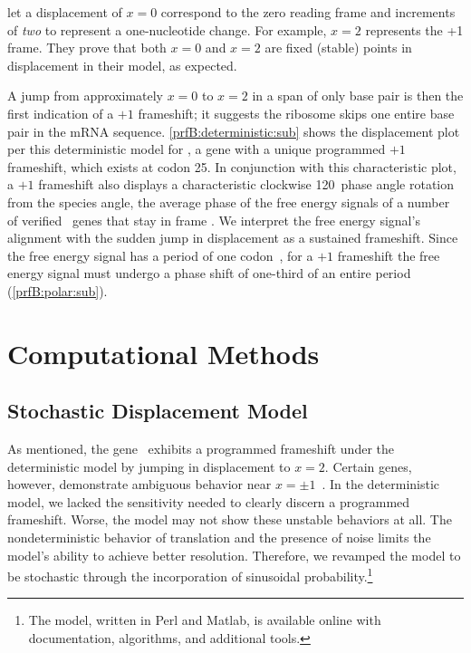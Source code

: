 \documentclass[12pt]{article}
\begin{document}
\citeauthor{lalit:mechanics} let a displacement of $x = 0$ correspond
to the zero reading frame and increments of \emph{two} to represent a
one-nucleotide change. For example, $x =2$ represents the +1 frame.
They prove that both $x = 0$ and $x = 2$ are fixed
(stable) points in displacement in their model, as expected.

A jump from approximately $x = 0$ to $x = 2$ in a span of only
base pair is then the first indication of a $+1$ frameshift; it
suggests the ribosome skips one entire base pair in the mRNA sequence.
\autoref{prfB:deterministic:sub} shows the displacement plot per this
deterministic model for \prfB, a gene with a unique programmed $+1$
frameshift, which exists at codon 25. In conjunction with this
characteristic plot, a $+1$ frameshift also displays a 
characteristic clockwise 120\degree\ phase angle rotation from the
species angle, the average phase of the free energy signals of a
number of verified \ecoli\ genes that stay in frame
\cite{lalit:mechanics}.  We interpret the free energy signal's
alignment with the sudden jump in displacement as a sustained
frameshift. Since the free energy signal has a period of one
codon~\cite{lalit:mechanics}, for a $+1$ frameshift the free energy signal
must undergo a phase shift of one-third of an entire period
(\autoref{prfB:polar:sub}).

\section{Computational Methods}

\subsection{Stochastic Displacement Model}
\label{stochastic}

As mentioned, the gene \prfB\ exhibits a programmed frameshift under
the deterministic model by jumping in displacement to $x=2$.  Certain
genes, however, demonstrate ambiguous behavior near
$x = \pm 1$~\cite{lalit:mechanics}.  In the deterministic model, we lacked the
sensitivity needed to clearly discern a programmed
frameshift. Worse, the model may not show these unstable
behaviors at all. The nondeterministic
behavior of translation and the presence of noise limits the model's
ability to achieve better resolution. Therefore, we revamped the model to be
stochastic through the incorporation of sinusoidal probability.\footnote{
  The model, written in Perl and Matlab, is available online with
  documentation, algorithms, and additional tools.
}
\end{document}
